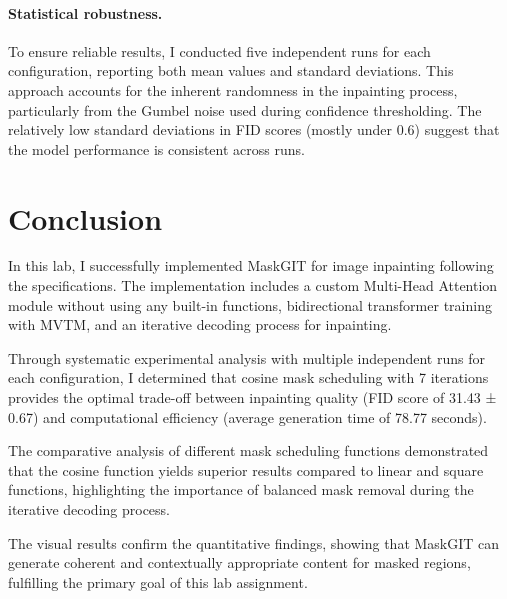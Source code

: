 \documentclass[twocolumn,a4paper]{article}
\begin{document}
\paragraph{Statistical robustness.} To ensure reliable results, I conducted five independent runs for each configuration, reporting both mean values and standard deviations. This approach accounts for the inherent randomness in the inpainting process, particularly from the Gumbel noise used during confidence thresholding. The relatively low standard deviations in FID scores (mostly under 0.6) suggest that the model performance is consistent across runs.

\section{Conclusion}

In this lab, I successfully implemented MaskGIT for image inpainting following the specifications. The implementation includes a custom Multi-Head Attention module without using any built-in functions, bidirectional transformer training with MVTM, and an iterative decoding process for inpainting.

Through systematic experimental analysis with multiple independent runs for each configuration, I determined that cosine mask scheduling with 7 iterations provides the optimal trade-off between inpainting quality (FID score of 31.43 ± 0.67) and computational efficiency (average generation time of 78.77 seconds).

The comparative analysis of different mask scheduling functions demonstrated that the cosine function yields superior results compared to linear and square functions, highlighting the importance of balanced mask removal during the iterative decoding process.

The visual results confirm the quantitative findings, showing that MaskGIT can generate coherent and contextually appropriate content for masked regions, fulfilling the primary goal of this lab assignment.

\printbibliography
\end{document}
